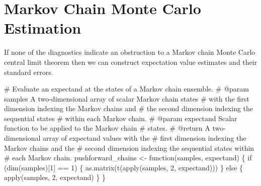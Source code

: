 \documentclass[
  letterpaper,
  DIV=11,
  numbers=noendperiod]{scrartcl}
\newenvironment{Shaded}{\begin{snugshade}}{\end{snugshade}}
\newcommand{\BuiltInTok}[1]{\textcolor[rgb]{0.00,0.23,0.31}{#1}}
\newcommand{\CommentTok}[1]{\textcolor[rgb]{0.37,0.37,0.37}{#1}}
\newcommand{\ControlFlowTok}[1]{\textcolor[rgb]{0.00,0.23,0.31}{#1}}
\newcommand{\DecValTok}[1]{\textcolor[rgb]{0.68,0.00,0.00}{#1}}
\newcommand{\ImportTok}[1]{\textcolor[rgb]{0.00,0.46,0.62}{#1}}
\newcommand{\NormalTok}[1]{\textcolor[rgb]{0.00,0.23,0.31}{#1}}
\newcommand{\OperatorTok}[1]{\textcolor[rgb]{0.37,0.37,0.37}{#1}}
\begin{document}
\section{Markov Chain Monte Carlo
Estimation}\label{markov-chain-monte-carlo-estimation}

If none of the diagnostics indicate an obstruction to a Markov chain
Monte Carlo central limit theorem then we can construct expectation
value estimates and their standard errors.

\begin{Shaded}
\begin{Highlighting}[]
\CommentTok{\# Evaluate an expectand at the states of a Markov chain ensemble.}
\CommentTok{\# @param samples A two{-}dimensional array of scalar Markov chain states }
\CommentTok{\#                with the first dimension indexing the Markov chains and }
\CommentTok{\#                the second dimension indexing the sequential states }
\CommentTok{\#                within each Markov chain.}
\CommentTok{\# @param expectand Scalar function to be applied to the Markov chain }
\CommentTok{\#                  states.}
\CommentTok{\# @return A two{-}dimensional array of expectand values with the }
\CommentTok{\#         first dimension indexing the Markov chains and the }
\CommentTok{\#         second dimension indexing the sequential states within }
\CommentTok{\#         each Markov chain.}
\NormalTok{pushforward\_chains }\OperatorTok{\textless{}{-}}\NormalTok{ function(samples, expectand) \{}
  \ControlFlowTok{if}\NormalTok{ (dim(samples)[}\DecValTok{1}\NormalTok{] }\OperatorTok{==} \DecValTok{1}\NormalTok{) \{}
    \ImportTok{as}\NormalTok{.matrix(t(}\BuiltInTok{apply}\NormalTok{(samples, }\DecValTok{2}\NormalTok{, expectand)))}
\NormalTok{  \} }\ControlFlowTok{else}\NormalTok{ \{}
    \BuiltInTok{apply}\NormalTok{(samples, }\DecValTok{2}\NormalTok{, expectand)}
\NormalTok{  \}}
\NormalTok{\}}
\end{Highlighting}
\end{Shaded}
\end{document}
